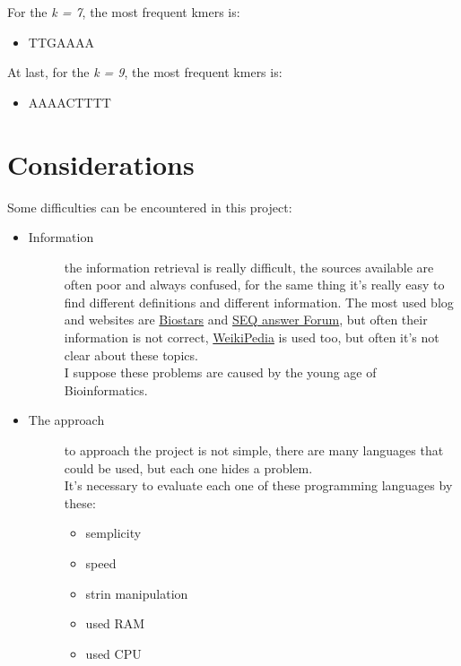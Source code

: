 For the \emph{k = 7}, the most frequent kmers is: 

\begin{itemize}
\item TTGAAAA
\end{itemize}

At last, for the  \emph{k = 9}, the most frequent kmers is:
\begin{itemize}
\item AAAACTTTT
\end{itemize}
 
\section{Considerations}

Some difficulties can be encountered in this project:
\begin{itemize}
\item \begin{description}
		\item[Information] the information retrieval is really difficult, the sources available  are often poor and always confused, for the same thing it's really easy to find different definitions and different information. The most used blog and websites are \href{https://www.biostars.org/}{Biostars} and \href{http://seqanswers.com/forums/}{SEQ answer Forum}, but often their information is not correct,  \href{https://it.wikipedia.org}{WeikiPedia} is used too, but often it's not clear about these topics.\\ I suppose these problems are caused by the young age of Bioinformatics.
  \end{description}
\end{itemize}


\begin{itemize}
\item \begin{description}
		\item[The approach] to approach the project is not simple, there are many languages that could be used, but each one hides a problem.\\
		It's necessary to evaluate each one of these programming languages by these:
		\begin{itemize}
			\item semplicity
			\item speed
			\item strin manipulation
			\item used RAM
			\item used CPU
		\end{itemize}
  \end{description}
\end{itemize}


